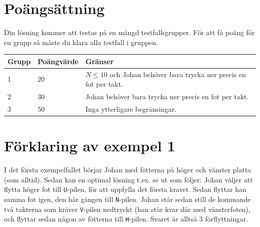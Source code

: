 \section*{Poängsättning}
Din lösning kommer att testas på en mängd testfallsgrupper.
För att få poäng för en grupp så måste du klara alla testfall i gruppen.

\noindent
\begin{tabular}{| l | l | p{12cm} |}
  \hline
  Grupp & Poängvärde & Gränser \\ \hline
  $1$    & $20$        & $N \le 10$ och Johan behöver bara trycka ner precis en fot per takt. \\ \hline 
  $2$    & $30$        & Johan behöver bara trycka ner precis en fot per takt. \\ \hline
  $3$    & $50$        & Inga ytterligare begränsingar. \\ \hline 
\end{tabular}

\section*{Förklaring av exempel 1}
I det första exempelfallet börjar Johan med fötterna på höger och vänster platta (som alltid).
Sedan kan en optimal lösning t.ex. se ut som följer: Johan väljer att flytta höger fot till \texttt{U}-pilen, för att uppfylla det första kravet.
Sedan flyttar han samma fot igen, den här gången till \texttt{N}-pilen.
Johan står sedan still de kommande två takterna som kräver \texttt{V}-pilen nedtryckt (han står kvar där med vänsterfoten), och flyttar sedan någon av fötterna till \texttt{H}-pilen.
Svaret är alltså $3$ förflyttningar.


